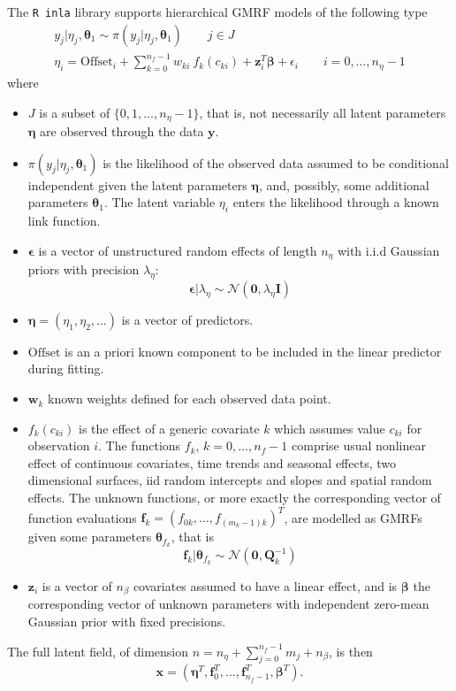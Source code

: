\documentclass[a4paper,11pt]{article}
\def\mm#1{\ensuremath{\boldsymbol{#1}}} %
\begin{document}
The {\tt R inla} library supports hierarchical GMRF models of the
following type
\begin{eqnarray}\label{eq1}
    y_j|\eta_j,\mm{\theta}_1\sim\pi(y_j|\eta_j,\mm{\theta}_1)\qquad
    j\in J \\\label{eq2}
    \eta_i=\mbox{Offset}_i+
    \sum_{k=0}^{n_f-1} w_{ki}\ f_k( c_{ki}) + \mm{z}_i^T\mm{\beta}+\epsilon_i\qquad i=0,\dots,n_{\eta}-1
\end{eqnarray}
where
\begin{itemize}
\item $J$ is a subset of $\{0,1,\dots,n_{\eta}-1\}$, that is, not
    necessarily all latent parameters $\mm{\eta}$ are observed through
    the data $\mm{y}$.
\item $\pi(y_j|\eta_j,\mm{\theta}_1)$ is the likelihood of the
    observed data assumed to be conditional independent given the
    latent parameters $\mm{\eta}$, and, possibly, some additional
    parameters $\mm{\theta}_1$. The latent variable $\eta_i$ enters
    the likelihood through a known link function.
\item $\mm{\epsilon}$ is a vector of unstructured random effects of
    length $n_{\eta}$ with i.i.d Gaussian priors with precision
    $\lambda_{\eta}$:
    \begin{equation}
        \mm{\epsilon}|\lambda_{\eta}\sim\mathcal{N}(\mm{0},\lambda_{\eta}\mm{I})
    \end{equation}
\item $\mm{\eta}=(\eta_1,\eta_2,\dots)$ is a vector of predictors.
\item{$\mbox{Offset}$} is an a priori known component to be
    included in the linear predictor during fitting.
\item$\mm{w}_k$ known weights defined for each observed data point.
\item $f_k(c_{ki})$ is the effect of a generic covariate $k$ which
    assumes value $c_{ki}$ for observation $i$.  The functions $f_k$,
    $k=0,\dots,n_f-1$ comprise usual nonlinear effect of continuous
    covariates, time trends and seasonal effects, two dimensional
    surfaces, iid random intercepts and slopes and spatial random
    effects. The unknown functions, or more exactly the corresponding
    vector of function evaluations
    $\mm{f}_k=(f_{0k},\dots,f_{(m_k-1)k})^T$, are modelled as GMRFs
    given some parameters $\mm{\theta}_{f_k}$, that is
    \begin{equation}
        \mm{f}_k|\mm{\theta}_{f_k}\sim\mathcal{N}(\mm{0},\mm{Q}^{-1}_k)
    \end{equation}
\item $\mm{z}_i$ is a vector of $n_{\beta}$ covariates assumed to have
    a linear effect, and is $\mm{\beta}$ the corresponding vector of
    unknown parameters with independent zero-mean Gaussian prior with
    fixed precisions.
\end{itemize}
The full latent field, of dimension
$n=n_{\eta}+\sum_{j=0}^{n_f-1}m_j+n_{\beta}$, is then
\[
\mm{x}=(\mm{\eta}^T,\mm{f}^T_0,\dots,\mm{f}_{n_f-1}^T,\mm{\beta}^T).
\]
\end{document}
